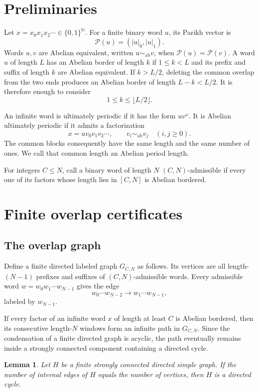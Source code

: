 \documentclass[11pt]{article}
\newtheorem{lemma}[theorem]{Lemma}
\newcommand{\Pvec}{\mathcal P}
\newcommand{\N}{\mathbb N}
\begin{document}
\section{Preliminaries}

Let $x=x_0x_1x_2\cdots\in\{0,1\}^{\N}$. For a finite binary word $u$, its
Parikh vector is
\[
\Pvec(u)=(|u|_0,|u|_1).
\]
Words $u,v$ are Abelian equivalent, written $u\sim_{\mathrm{ab}}v$, when
$\Pvec(u)=\Pvec(v)$. A word $u$ of length $L$ has an Abelian border of length
$k$ if $1\le k<L$ and its prefix and suffix of length $k$ are Abelian
equivalent. If $k>L/2$, deleting the common overlap from the two ends produces
an Abelian border of length $L-k<L/2$. It is therefore enough to consider
\[
1\le k\le\lfloor L/2\rfloor.
\]

An infinite word is ultimately periodic if it has the form $uv^\omega$. It
is Abelian ultimately periodic if it admits a factorization
\[
x=uv_0v_1v_2\cdots,
\qquad v_i\sim_{\mathrm{ab}}v_j\quad(i,j\ge0).
\]
The common blocks consequently have the same length and the same number of
ones. We call that common length an Abelian period length.

For integers $C\le N$, call a binary word of length $N$ $(C,N)$-admissible if
every one of its factors whose length lies in $[C,N]$ is Abelian bordered.

\section{Finite overlap certificates}

\subsection{The overlap graph}

Define a finite directed labeled graph $G_{C,N}$ as follows. Its vertices are
all length-$(N-1)$ prefixes and suffixes of $(C,N)$-admissible words. Every
admissible word $w=w_0w_1\cdots w_{N-1}$ gives the edge
\[
w_0\cdots w_{N-2}\longrightarrow w_1\cdots w_{N-1},
\]
labeled by $w_{N-1}$.

If every factor of an infinite word $x$ of length at least $C$ is Abelian
bordered, then its consecutive length-$N$ windows form an infinite path in
$G_{C,N}$. Since the condensation of a finite directed graph is acyclic, the
path eventually remains inside a strongly connected component containing a
directed cycle.

\begin{lemma}\label{lem:cycle}
Let $H$ be a finite strongly connected directed simple graph. If the number
of internal edges of $H$ equals the number of vertices, then $H$ is a directed
cycle.
\end{lemma}
\end{document}
